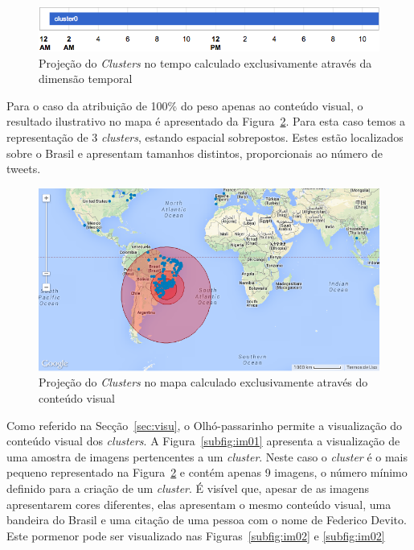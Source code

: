 \begin{figure}[!h]
\centering
\includegraphics[width=0.9\linewidth]{./figures/olhopassarinho/time11}
\caption{Projeção do \textit{Clusters} no tempo calculado exclusivamente através da dimensão temporal}
\label{fig:time11}
\end{figure}

Para o caso da atribuição de 100\% do peso apenas ao conteúdo visual, o resultado ilustrativo no mapa é apresentado da Figura~\ref{fig:map33}. Para esta caso temos a representação de 3 \textit{clusters}, estando espacial sobrepostos. Estes estão localizados sobre o Brasil e apresentam tamanhos distintos, proporcionais ao número de tweets.

\begin{figure}[!h]
\centering
\includegraphics[width=0.8\linewidth]{./figures/olhopassarinho/map33}
\caption{Projeção do \textit{Clusters} no mapa calculado exclusivamente através do conteúdo visual}
\label{fig:map33}
\end{figure}

Como referido na Secção~\ref{sec:visu}, o Olhó-passarinho permite a visualização do conteúdo visual dos \textit{clusters}. A Figura~\ref{subfig:im01} apresenta a visualização de uma amostra de imagens pertencentes a um \textit{cluster}. Neste caso o \textit{cluster} é o mais pequeno representado na Figura~\ref{fig:map33} e contém apenas 9 imagens, o número mínimo definido para a criação de um \textit{cluster}. É visível que, apesar de as imagens apresentarem cores diferentes, elas apresentam o mesmo conteúdo visual, uma bandeira do Brasil e uma citação de uma pessoa com o nome de Federico Devito. Este pormenor pode ser visualizado nas Figuras~\ref{subfig:im02} e \ref{subfig:im02}

